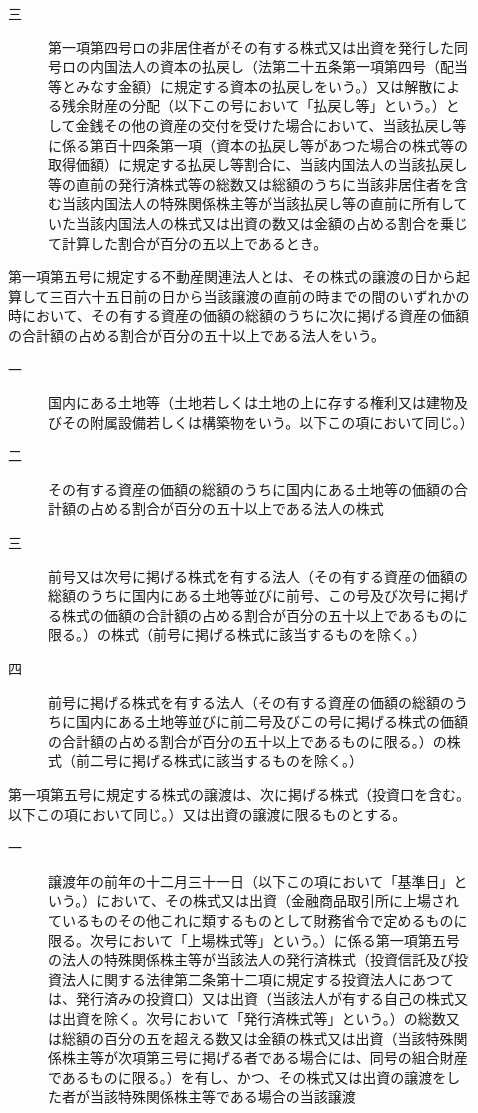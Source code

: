 \documentclass[twocolumn,a4j,10pt]{ltjtarticle}
\begin{document}
\begin{description}
\begin{description}
\begin{description}
\end{description}
\item[三]第一項第四号ロの非居住者がその有する株式又は出資を発行した同号ロの内国法人の資本の払戻し（法第二十五条第一項第四号（配当等とみなす金額）に規定する資本の払戻しをいう。）又は解散による残余財産の分配（以下この号において「払戻し等」という。）として金銭その他の資産の交付を受けた場合において、当該払戻し等に係る第百十四条第一項（資本の払戻し等があつた場合の株式等の取得価額）に規定する払戻し等割合に、当該内国法人の当該払戻し等の直前の発行済株式等の総数又は総額のうちに当該非居住者を含む当該内国法人の特殊関係株主等が当該払戻し等の直前に所有していた当該内国法人の株式又は出資の数又は金額の占める割合を乗じて計算した割合が百分の五以上であるとき。
\end{description}
\item[\rensuji{8}]第一項第五号に規定する不動産関連法人とは、その株式の譲渡の日から起算して三百六十五日前の日から当該譲渡の直前の時までの間のいずれかの時において、その有する資産の価額の総額のうちに次に掲げる資産の価額の合計額の占める割合が百分の五十以上である法人をいう。
\begin{description}
\item[一]国内にある土地等（土地若しくは土地の上に存する権利又は建物及びその附属設備若しくは構築物をいう。以下この項において同じ。）
\item[二]その有する資産の価額の総額のうちに国内にある土地等の価額の合計額の占める割合が百分の五十以上である法人の株式
\item[三]前号又は次号に掲げる株式を有する法人（その有する資産の価額の総額のうちに国内にある土地等並びに前号、この号及び次号に掲げる株式の価額の合計額の占める割合が百分の五十以上であるものに限る。）の株式（前号に掲げる株式に該当するものを除く。）
\item[四]前号に掲げる株式を有する法人（その有する資産の価額の総額のうちに国内にある土地等並びに前二号及びこの号に掲げる株式の価額の合計額の占める割合が百分の五十以上であるものに限る。）の株式（前二号に掲げる株式に該当するものを除く。）
\end{description}
\item[\rensuji{9}]第一項第五号に規定する株式の譲渡は、次に掲げる株式（投資口を含む。以下この項において同じ。）又は出資の譲渡に限るものとする。
\begin{description}
\item[一]譲渡年の前年の十二月三十一日（以下この項において「基準日」という。）において、その株式又は出資（金融商品取引所に上場されているものその他これに類するものとして財務省令で定めるものに限る。次号において「上場株式等」という。）に係る第一項第五号の法人の特殊関係株主等が当該法人の発行済株式（投資信託及び投資法人に関する法律第二条第十二項に規定する投資法人にあつては、発行済みの投資口）又は出資（当該法人が有する自己の株式又は出資を除く。次号において「発行済株式等」という。）の総数又は総額の百分の五を超える数又は金額の株式又は出資（当該特殊関係株主等が次項第三号に掲げる者である場合には、同号の組合財産であるものに限る。）を有し、かつ、その株式又は出資の譲渡をした者が当該特殊関係株主等である場合の当該譲渡

\end{description}
\end{description}
\end{document}
